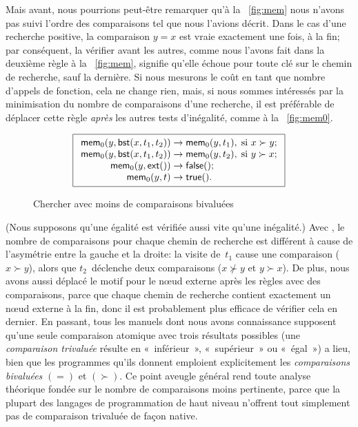 Mais avant, nous pourrions peut-être remarquer qu'à la
\fig~\vref{fig:mem} nous n'avons pas suivi l'ordre des comparaisons
tel que nous l'avions décrit. Dans le cas d'une recherche positive, la
comparaison \(y = x\) est vraie exactement une fois, à la fin; par
conséquent, la vérifier avant les autres, comme nous l'avons fait dans
la deuxième règle à la \fig~\vref{fig:mem}, signifie qu'elle échoue
pour toute clé sur le chemin de recherche, sauf la dernière. Si nous
mesurons le coût en tant que nombre d'appels de fonction, cela ne
change rien, mais, si nous sommes intéressés par la minimisation du
nombre de comparaisons d'une recherche, il est préférable de déplacer
cette règle \emph{après} les autres tests d'inégalité, comme à la
\fig~\vref{fig:mem0}.
\begin{figure}
\begin{equation*}
\boxed{
\begin{array}{r@{\;}l@{\;}l}
\fun{mem}_0(y,\fun{bst}(x,t_1,t_2)) & \rightarrow &
  \fun{mem}_0(y,t_1), \; \text{si \(x \succ y\)};\\
\fun{mem}_0(y,\fun{bst}(x,t_1,t_2)) & \rightarrow &
  \fun{mem}_0(y,t_2),\; \text{si \(y \succ x\)};\\
\fun{mem}_0(y,\fun{ext}()) & \rightarrow & \fun{false}();\\
\fun{mem}_0(y,t) & \rightarrow & \fun{true}().
\end{array}}
\end{equation*}
\caption{Chercher avec moins de comparaisons bivaluées}
\label{fig:mem0}
\end{figure}
(Nous supposons qu'une égalité est vérifiée aussi vite qu'une
inégalité.) Avec , le
nombre de comparaisons pour chaque chemin de recherche est différent à
cause de l'asymétrie entre la gauche et la droite: la visite
de~\(t_1\) cause une comparaison (\(x \succ y\)), alors que
\(t_2\)~déclenche deux comparaisons (\(x \nsucc y\) et \(y \succ
x\)). De plus, nous avons aussi déplacé le motif pour le nœud
externe après les règles avec des comparaisons, parce que chaque
chemin de recherche contient exactement un nœud externe à la fin,
donc il est probablement plus efficace de vérifier cela en dernier. En
passant, tous les manuels dont nous avons connaissance supposent
qu'une seule comparaison atomique avec trois résultats possibles (une
\emph{comparaison trivaluée} résulte en «~inférieur~», «~supérieur~» ou
«~égal~») a lieu, bien que les programmes qu'ils donnent emploient
explicitement les \emph{comparaisons bivaluées} \((=)\) et
\((\succ)\). Ce point aveugle général rend toute analyse théorique
fondée sur le nombre de comparaisons moins pertinente, parce que la
plupart des langages de programmation de haut niveau n'offrent tout
simplement pas de comparaison trivaluée de façon native.

